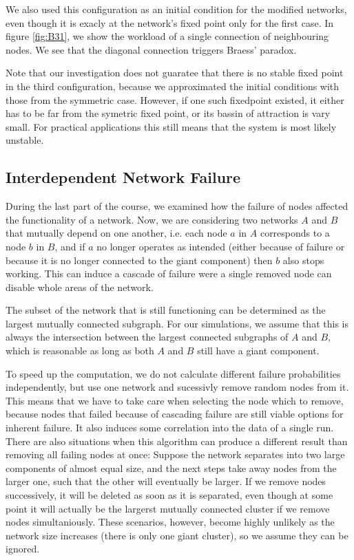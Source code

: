 \documentclass{scrartcl}
\begin{document}
We also used this configuration as an initial condition for the modified
networks, even though it is exacly at the network's fixed point only for the
first case. In figure \ref{fig:B31}, we show the workload of a single
connection of neighbouring nodes. We see that the diagonal connection
triggers Braess' paradox. 

Note that our investigation does not guaratee that there is no stable fixed
point in the third configuration, because we approximated the initial
conditions with those from the symmetric case. However, if one such
fixedpoint existed, it either has to be far from the symetric fixed point,
or its bassin of attraction is vary small. For practical applications this
still means that the system is most likely unstable.



\subsection{Interdependent Network Failure}
During the last part of the course, we examined how the failure of nodes
affected the functionality of a network. Now, we are considering two
networks $A$ and $B$ that mutually depend on one another, i.e. each node
$a$ in $A$ corresponds to a node $b$ in $B$, and if $a$ no longer operates
as intended (either because of failure or because it is no longer connected
to the giant component) then $b$ also stops working.  This can induce
a cascade of failure were a single removed node can disable whole areas of
the network.

The subset of the network that is still functioning can be determined as
the largest mutually connected subgraph. For our simulations, we assume
that this is always the intersection between the largest connected
subgraphs of $A$ and $B$, which is reasonable as long as both $A$ and $B$
still have a giant component. 

To speed up the computation, we do not calculate different failure
probabilities independently, but use one network and sucessivly remove
random nodes from it. This means that we have to take care when selecting
the node which to remove, because nodes that failed because of cascading
failure are still viable options for inherent failure. It also induces some
correlation into the data of a single run.  There are also situations when
this algorithm can produce a different result than removing all failing
nodes at once: Suppose the network separates into two large components of
almost equal size, and the next steps take away nodes from the larger one,
such that the other will eventually be larger. If we remove nodes
successively, it will be deleted as soon as it is separated, even though at
some point it will actually be the largerst mutually connected cluster if
we remove nodes simultaniously.  These scenarios, however, become highly
unlikely as the network size increases (there is only one giant cluster),
so we assume they can be ignored. 
\end{document}

